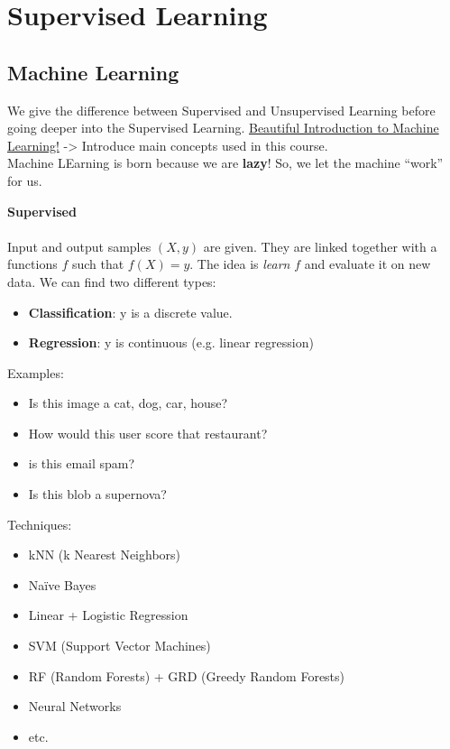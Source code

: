 

\section{Supervised Learning}
 
\subsection{Machine Learning}
We give the difference between Supervised and Unsupervised Learning before going deeper into the Supervised Learning.
\href{http://www.r2d3.us/visual-intro-to-machine-learning-part-1/}{Beautiful Introduction to Machine Learning!} -> Introduce main concepts used in this course.
\\
Machine LEarning is born because we are \textbf{lazy}! So, we let the machine ``work'' for us.


\textbf{Supervised} 
\\\\
Input and output samples $(X,y)$ are given. They are linked together with a functions $f$ such that $f(X) = y$. The idea is \emph{learn} $f$ and evaluate it on new data. We can find two different types:
\begin{itemize}
 \item \textbf{Classification}: y is a discrete value.
 \item \textbf{Regression}: y is continuous (e.g. linear regression)
\end{itemize}
Examples:
\begin{itemize}
 \item Is this image a cat, dog, car, house?
 \item How would this user score that restaurant?
 \item is this email spam?
 \item Is this blob a supernova?
\end{itemize}
Techniques:
\begin{itemize}
 \item kNN (k Nearest Neighbors)
 \item Na\"ive Bayes
 \item Linear + Logistic Regression
 \item SVM (Support Vector Machines)
 \item RF (Random Forests) + GRD (Greedy Random Forests)
 \item Neural Networks
 \item etc.
\end{itemize}

